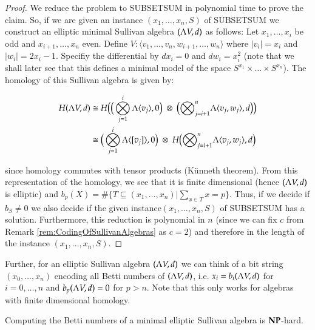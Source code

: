 \begin{proof}
  We reduce the problem to SUBSETSUM in polynomial time to prove the claim.
  So, if we are given an instance $(x_1, \ldots, x_n, S)$ of SUBSETSUM we construct an elliptic minimal Sullivan
  algebra $(\Lambda V,d)$ as follows: \newline
  Let $x_1, \ldots, x_i$ be odd and $x_{i+1}, \ldots, x_n$ even. Define 
  $V \colon \langle v_1, \ldots, v_n, w_{i+1}, \ldots , w_n \rangle$ where $|v_i| = x_i$ and $|w_i| = 2x_i -1$.
  Specifiy the differential by $dx_i = 0$ and $dw_i = x_i^2$ (note that we shall later see that this defines 
  a minimal model of the space $S^{x_1} \times \ldots \times S^{x_n}$). The homology of this Sullivan algebra is given by:
   
  \begin{align*}
  H (\Lambda V,d) &\cong H \big{(} \big{(}\bigotimes_{j = 1}^i \Lambda \langle v_j \rangle , 0 \big{)} \;\otimes \;  
  \big{(} {\bigotimes}_{j=i + 1}^n \Lambda \langle v_{j} ,w_{j}\rangle , d \big{)} \big{)}  \\
  &\cong \big{(} \bigotimes_{j = 1}^i \Lambda \langle [v_j] \rangle , 0 \big{)}
  \; \otimes \;H \big{(}  {\bigotimes}_{j=i + 1}^n \Lambda \langle v_{j} ,w_{j}\rangle  , d\big{)}
  \end{align*}
  
  since homology commutes with tensor products (Künneth theorem). From this representation of the homology,
  we see that it is finite dimensional (hence $(\Lambda V,d)$ is elliptic) and 
  ${b_p(X) = \# {\lbrace T \subseteq (x_1, \ldots, x_n) | \sum_{x \in T} x = p \rbrace}}$.
  Thus, if we decide if $b_S \neq 0$ we also decide if the given instance$(x_1, \ldots, x_n, S)$ of SUBSETSUM
  has a solution. Furthermore, this reduction is polynomial in $n$ 
  (since we can fix $c$ from Remark \ref{rem:CodingOfSullivanAlgebras} as $c = 2$)
  and therefore in the length of the instance $(x_1, \ldots, x_n, S)$. 
 \end{proof}

 Further, for an elliptic Sullivan algebra $(\Lambda V,d)$ we can think of a bit string $(x_0, \ldots, x_n)$ encoding all 
 Betti numbers of $(\Lambda V,d)$, i.e. $x_i = b_i (\Lambda V,d)$ for $i = 0,\ldots, n$ and $b_p (\Lambda V,d) = 0$ for $p > n$.
 Note that this only works for algebras with finite dimensional homology.
  
 
 \begin{Corollary}
 \label{thm:AlgebrasComputingBettiNumbers}
  Computing the Betti numbers of a minimal elliptic Sullivan algebra is $\mathbf{NP}$-hard.
 \end{Corollary}
